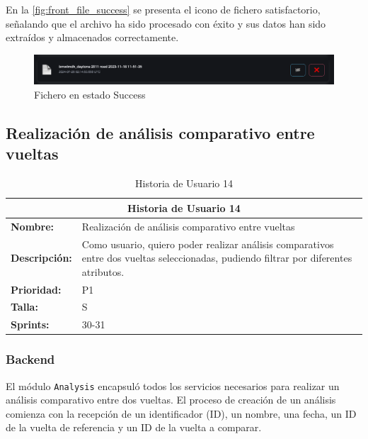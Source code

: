 En la \autoref{fig:front_file_success} se presenta el icono de fichero satisfactorio, señalando que el archivo ha sido procesado con éxito y sus datos han sido extraídos y almacenados correctamente.

\begin{figure}[H]
\centering
\includegraphics[width=1\linewidth]{./figs/herramientas/desarrollo/front_file_success.png}
\caption[Fichero en estado Success]{Fichero en estado Success}
\label{fig:front_file_success}
\end{figure}

\subsection{Realización de análisis comparativo entre vueltas}
\begin{table}[H]
\centering
\begin{tabular}{|l|p{10cm}|}
\hline
\multicolumn{2}{|c|}{\textbf{Historia de Usuario 14}} \\ \hline
\textbf{Nombre:} & Realización de análisis comparativo entre vueltas \\ \hline
\textbf{Descripción:} & Como usuario, quiero poder realizar análisis comparativos entre dos vueltas seleccionadas, pudiendo filtrar por diferentes atributos. \\ \hline
\textbf{Prioridad:} & P1 \\ \hline
\textbf{Talla:} & S \\ \hline
\textbf{Sprints:} & 30-31 \\ \hline
\end{tabular}
\caption{Historia de Usuario 14}
\label{tab:analisis_comparativo_vueltas}
\end{table}

\subsubsection*{Backend}

El módulo \texttt{Analysis} encapsuló todos los servicios necesarios para realizar un análisis comparativo entre dos vueltas. El proceso de creación de un análisis comienza con la recepción de un identificador (ID), un nombre, una fecha, un ID de la vuelta de referencia y un ID de la vuelta a comparar.

